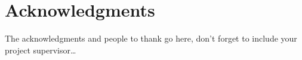 \thispagestyle{empty}
\section*{Acknowledgments}

The acknowledgments and people to thank go here, don't forget to include your project supervisor\ldots

\newpage
\thispagestyle{empty}
\mbox{}
\newpage